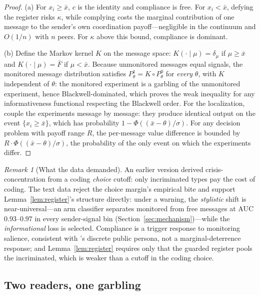 \documentclass[11pt]{article}
\theoremstyle{remark}
\newtheorem{remark}{Remark}
\begin{document}
\begin{proof}
(a) For $x_i \ge \bar x$, $c$ is the identity and compliance is free. For $x_i < \bar x$, defying the register risks $\kappa$, while complying costs the marginal contribution of one message to the sender's own coordination payoff---negligible in the continuum and $O(1/n)$ with $n$ peers. For $\kappa$ above this bound, compliance is dominant.

(b) Define the Markov kernel $K$ on the message space: $K(\cdot \mid \mu) = \delta_\mu$ if $\mu \ge \bar x$ and $K(\cdot \mid \mu) = \bar F$ if $\mu < \bar x$. Because unmonitored messages equal signals, the monitored message distribution satisfies $P^1_\theta = K \circ P^0_\theta$ for \emph{every} $\theta$, with $K$ independent of $\theta$: the monitored experiment is a garbling of the unmonitored experiment, hence Blackwell-dominated, which proves the weak inequality for any informativeness functional respecting the Blackwell order. For the localization, couple the experiments message by message: they produce identical output on the event $\{x_i \ge \bar x\}$, which has probability $1 - \Phi((\bar x - \theta)/\sigma)$. For any decision problem with payoff range $R$, the per-message value difference is bounded by $R \cdot \Phi((\bar x - \theta)/\sigma)$, the probability of the only event on which the experiments differ.
\end{proof}

\begin{remark}[What the data demanded]\label{rem:uniform}
An earlier version derived crisis-concentration from a coding \emph{choice} cutoff: only incriminated types pay the cost of coding. The text data reject the choice margin's empirical bite and support Lemma~\ref{lem:register}'s structure directly: under a warning, the \emph{stylistic} shift is near-universal---an arm classifier separates monitored from free messages at AUC $0.93$--$0.97$ in every sender-signal bin (Section~\ref{sec:mechanism})---while the \emph{informational} loss is selected. Compliance is a trigger response to monitoring salience, consistent with \citet{kuran1991}'s discrete public persona, not a marginal-deterrence response; and Lemma~\ref{lem:register} requires only that the guarded register pools the incriminated, which is weaker than a cutoff in the coding choice.
\end{remark}

\subsection{Two readers, one garbling}
\end{document}
